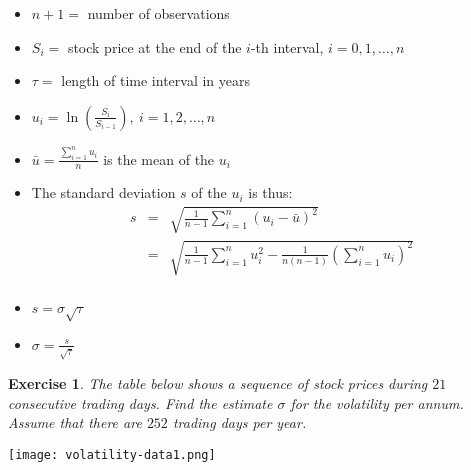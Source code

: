 \documentclass[letterpaper,10pt]{article}
\newcommand{\Sum}[2]{\ensuremath{\sum\limits}_{#1}^{#2}}
\newtheorem{ex}{Exercise}
\begin{document}
\begin{itemize}

\item $n+1=$ number of observations

\item $S_i=$ stock price at the end of the $i$-th interval, $i=0,1,\ldots,n$

\item $\tau=$ length of time interval in years


\item $\displaystyle u_i=\ln\left(\frac{S_i}{S_{i-1}}\right),~i=1,2,\ldots,n$

\item $\displaystyle\bar{u}=\frac{\Sum{i=1}{n}u_i}{n}$ is the mean of the $u_i$


    \item The standard deviation $s$ of the $u_i$ is thus: \begin{eqnarray*} s&=&\sqrt{\frac{1}{n-1}\Sum{i=1}{n}(u_i-\bar{u})^2}\\
    &=&\sqrt{\frac{1}{n-1}\Sum{i=1}{n}u_i^2-\frac{1}{n(n-1)}\left(\Sum{i=1}{n}u_i\right)^2}\\
    \end{eqnarray*}

\item $\displaystyle s=\sigma\sqrt{\tau}$

\item $\displaystyle \sigma=\frac{s}{\sqrt{\tau}}$

\end{itemize}

\begin{ex}
The table below shows a sequence of stock prices during $21$ consecutive trading days.  Find the estimate $\sigma$ for the volatility per annum.  Assume that there are $252$ trading days per year.
\end{ex}

\texttt{[image: volatility-data1.png]}

\bigskip
\end{document}
